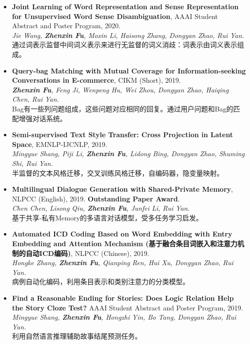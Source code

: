\documentclass[letterpaper]{article}
\begin{document}
\begin{itemize}

\item \textbf{Joint Learning of Word Representation and Sense Representation for Unsupervised Word Sense Disambiguation}, AAAI Student Abstract and Poster Program, 2020. \\
{\it Jie Wang, \textbf{Zhenxin Fu}, Moxin Li, Haisong Zhang, Dongyan Zhao, Rui Yan.} \\
通过词表示监督中间词义表示来进行无监督的词义消歧：词表示由词义表示组成。

\item \textbf{Query-bag Matching with Mutual Coverage for Information-seeking Conversations in E-commerce}, CIKM (Short), 2019. \\
{\it \textbf{Zhenxin Fu}, Feng Ji, Wenpeng Hu, Wei Zhou, Dongyan Zhao, Haiqing Chen, Rui Yan. } \\
Bag有一些列问题组成，这些问题对应相同的回复。通过用户问题和Bag的匹配增强对话系统。

\item \textbf{Semi-supervised Text Style Transfer: Cross Projection in Latent Space}, EMNLP-IJCNLP, 2019. \\
{\it Mingyue Shang, Piji Li, \textbf{Zhenxin Fu}, Lidong Bing, Dongyan Zhao, Shuming Shi, Rui Yan.} \\
半监督的文本风格迁移，交叉训练风格迁移，自编码器，隐变量映射。

\item \textbf{Multilingual Dialogue Generation with Shared-Private Memory}, NLPCC (English), 2019. \textbf{Outstanding Paper Award}. \\
{\it Chen Chen, Lisong Qiu, \textbf{Zhenxin Fu}, Junfei Li, Rui Yan. } \\
基于共享-私有Memory的多语言对话模型，受多任务学习启发。

\item \textbf{Automated ICD Coding Based on Word Embedding with Entry Embedding and Attention Mechanism (基于融合条目词嵌入和注意力机制的自动ICD编码)}, NLPCC (Chinese), 2019. \\
{\it Hongke Zhang, \textbf{Zhenxin Fu}, Qianping Ren, Hui Xu, Dongyan Zhao, Rui Yan.} \\
病例自动化编码，利用条目表示和类别注意力的分类模型。

\item \textbf{Find a Reasonable Ending for Stories: Does Logic Relation Help the Story Cloze Test?} AAAI Student Abstract and Poster Program, 2019. \\
{\it Mingyue Shang, \textbf{Zhenxin Fu}, Hongzhi Yin, Bo Tang, Dongyan Zhao, Rui Yan.} \\
利用自然语言推理辅助故事结尾预测任务。


\end{itemize}
\end{document}
